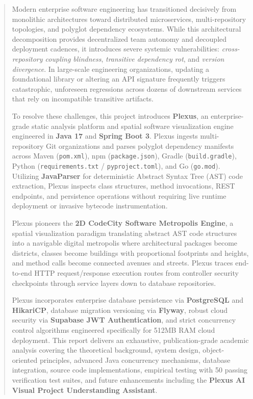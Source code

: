 \documentclass[11pt,a4paper,openany]{report}
\begin{document}
\setcounter{page}{1}

\begin{abstract}
\noindent
Modern enterprise software engineering has transitioned decisively from monolithic architectures toward distributed microservices, multi-repository topologies, and polyglot dependency ecosystems. While this architectural decomposition provides decentralized team autonomy and decoupled deployment cadences, it introduces severe systemic vulnerabilities: \textit{cross-repository coupling blindness}, \textit{transitive dependency rot}, and \textit{version divergence}. In large-scale engineering organizations, updating a foundational library or altering an API signature frequently triggers catastrophic, unforeseen regressions across dozens of downstream services that rely on incompatible transitive artifacts.

To resolve these challenges, this project introduces \textbf{Plexus}, an enterprise-grade static analysis platform and spatial software visualization engine engineered in \textbf{Java 17} and \textbf{Spring Boot 3}. Plexus ingests multi-repository Git organizations and parses polyglot dependency manifests across Maven (\texttt{pom.xml}), npm (\texttt{package.json}), Gradle (\texttt{build.gradle}), Python (\texttt{requirements.txt} / \texttt{pyproject.toml}), and Go (\texttt{go.mod}). Utilizing \textbf{JavaParser} for deterministic Abstract Syntax Tree (AST) code extraction, Plexus inspects class structures, method invocations, REST endpoints, and persistence operations without requiring live runtime deployment or invasive bytecode instrumentation.

Plexus pioneers the \textbf{2D CodeCity Software Metropolis Engine}, a spatial visualization paradigm translating abstract AST code structures into a navigable digital metropolis where architectural packages become districts, classes become buildings with proportional footprints and heights, and method calls become connected avenues and streets. Plexus traces end-to-end HTTP request/response execution routes from controller security checkpoints through service layers down to database repositories.

Plexus incorporates enterprise database persistence via \textbf{PostgreSQL} and \textbf{HikariCP}, database migration versioning via \textbf{Flyway}, robust cloud security via \textbf{Supabase JWT Authentication}, and strict concurrency control algorithms engineered specifically for 512MB RAM cloud deployment. This report delivers an exhaustive, publication-grade academic analysis covering the theoretical background, system design, object-oriented principles, advanced Java concurrency mechanisms, database integration, source code implementations, empirical testing with 50 passing verification test suites, and future enhancements including the \textbf{Plexus AI Visual Project Understanding Assistant}.
\end{abstract}
\end{document}
